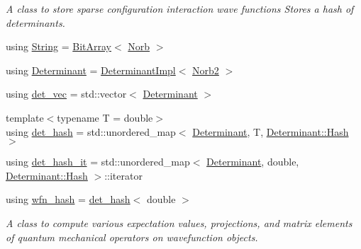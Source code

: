 \begin{DoxyCompactItemize}
\begin{DoxyCompactList}\small\item\em A class to store sparse configuration interaction wave functions Stores a hash of determinants. \end{DoxyCompactList}\item 
using \mbox{\hyperlink{namespaceforte_a840d1bfd3a8b3c16e09979212f37313f}{String}} = \mbox{\hyperlink{classforte_1_1_bit_array}{Bit\+Array}}$<$ \mbox{\hyperlink{namespaceforte_ac7cda07e927e5e88a2c8c754044915e2}{Norb}} $>$
\item 
using \mbox{\hyperlink{namespaceforte_a2076c63fd7b8732004d9e1442ce527c1}{Determinant}} = \mbox{\hyperlink{classforte_1_1_determinant_impl}{Determinant\+Impl}}$<$ \mbox{\hyperlink{namespaceforte_adf4c83dd9e12e4643afac07f1a89e7bb}{Norb2}} $>$
\item 
using \mbox{\hyperlink{namespaceforte_a2957b68e47fded14fd14ef47796ed751}{det\+\_\+vec}} = std\+::vector$<$ \mbox{\hyperlink{namespaceforte_a2076c63fd7b8732004d9e1442ce527c1}{Determinant}} $>$
\item 
{\footnotesize template$<$typename T  = double$>$ }\\using \mbox{\hyperlink{namespaceforte_a47c4b5da48301071e46f500b6a674d7b}{det\+\_\+hash}} = std\+::unordered\+\_\+map$<$ \mbox{\hyperlink{namespaceforte_a2076c63fd7b8732004d9e1442ce527c1}{Determinant}}, T, \mbox{\hyperlink{structforte_1_1_bit_array_1_1_hash}{Determinant\+::\+Hash}} $>$
\item 
using \mbox{\hyperlink{namespaceforte_a8c024ae1d9bb8c77b3d77b8e3a14d036}{det\+\_\+hash\+\_\+it}} = std\+::unordered\+\_\+map$<$ \mbox{\hyperlink{namespaceforte_a2076c63fd7b8732004d9e1442ce527c1}{Determinant}}, double, \mbox{\hyperlink{structforte_1_1_bit_array_1_1_hash}{Determinant\+::\+Hash}} $>$\+::iterator
\item 
using \mbox{\hyperlink{namespaceforte_a3246784b716a22429c59b8dc326449e3}{wfn\+\_\+hash}} = \mbox{\hyperlink{namespaceforte_a47c4b5da48301071e46f500b6a674d7b}{det\+\_\+hash}}$<$ double $>$
\begin{DoxyCompactList}\small\item\em A class to compute various expectation values, projections, and matrix elements of quantum mechanical operators on wavefunction objects. \end{DoxyCompactList}\end{DoxyCompactItemize}
